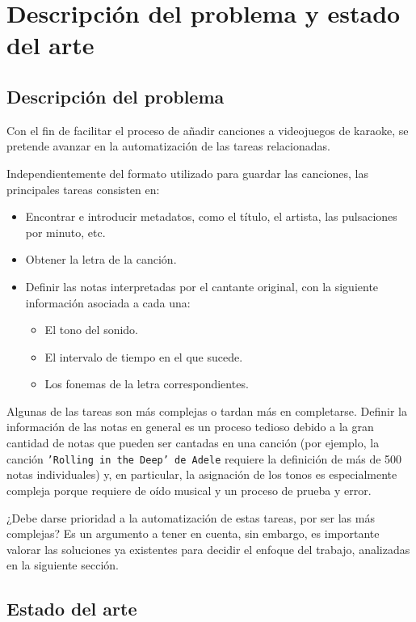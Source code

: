 \chapter{Descripción del problema y estado del arte}

\section{Descripción del problema}
\label{sec:problemdescription}

Con el fin de facilitar el proceso de añadir canciones a videojuegos de karaoke, se pretende avanzar en la automatización de las tareas relacionadas.

Independientemente del formato utilizado para guardar las canciones, las principales tareas consisten en:

\begin{itemize}
	\item{Encontrar e introducir metadatos, como el título, el artista, las pulsaciones por minuto, etc.}
	\item{Obtener la letra de la canción.}
	\item{Definir las notas interpretadas por el cantante original, con la siguiente información asociada a cada una:}
	\begin{itemize}
		\item{El tono del sonido.}
		\item{El intervalo de tiempo en el que sucede.}
		\item{Los fonemas de la letra correspondientes.}
	\end{itemize}
\end{itemize}

Algunas de las tareas son más complejas o tardan más en completarse. Definir la información de las notas en general es un proceso tedioso debido a la gran cantidad de notas que pueden ser cantadas en una canción (por ejemplo, la canción \texttt{'Rolling in the Deep' de Adele} requiere la definición de más de 500 notas individuales) y, en particular, la asignación de los tonos es especialmente compleja porque requiere de oído musical y un proceso de prueba y error.

¿Debe darse prioridad a la automatización de estas tareas, por ser las más complejas? Es un argumento a tener en cuenta, sin embargo, es importante valorar las soluciones ya existentes para decidir el enfoque del trabajo, analizadas en la siguiente sección.

\section{Estado del arte}

